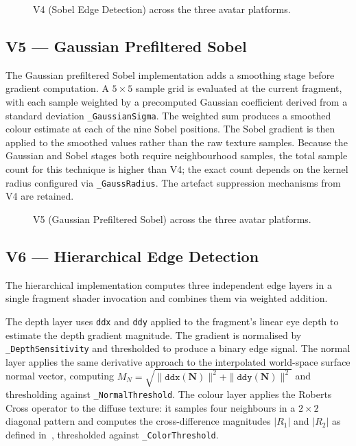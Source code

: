 \begin{figure}[H]
  \centering
  \caption{V4 (Sobel Edge Detection) across the three avatar platforms.}
  \label{fig:v4_impl}
\end{figure}

\subsection{V5 — Gaussian Prefiltered Sobel}
\label{sec:impl_v5}

The Gaussian prefiltered Sobel implementation adds a smoothing stage before gradient computation. A $5\times5$ sample grid is evaluated at the current fragment, with each sample weighted by a precomputed Gaussian coefficient derived from a standard deviation \texttt{\_GaussianSigma}. The weighted sum produces a smoothed colour estimate at each of the nine Sobel positions. The Sobel gradient is then applied to the smoothed values rather than the raw texture samples. Because the Gaussian and Sobel stages both require neighbourhood samples, the total sample count for this technique is higher than V4; the exact count depends on the kernel radius configured via \texttt{\_GaussRadius}. The artefact suppression mechanisms from V4 are retained.

\begin{figure}[H]
  \centering
  \caption{V5 (Gaussian Prefiltered Sobel) across the three avatar platforms.}
  \label{fig:v5_impl}
\end{figure}

\subsection{V6 — Hierarchical Edge Detection}
\label{sec:impl_v6}

The hierarchical implementation computes three independent edge layers in a single fragment shader invocation and combines them via weighted addition.

The depth layer uses \texttt{ddx} and \texttt{ddy} applied to the fragment's linear eye depth to estimate the depth gradient magnitude. The gradient is normalised by \texttt{\_DepthSensitivity} and thresholded to produce a binary edge signal. The normal layer applies the same derivative approach to the interpolated world-space surface normal vector, computing $M_N = \sqrt{\|\texttt{ddx}(\mathbf{N})\|^2 + \|\texttt{ddy}(\mathbf{N})\|^2}$ and thresholding against \texttt{\_NormalThreshold}. The colour layer applies the Roberts Cross operator to the diffuse texture: it samples four neighbours in a $2\times2$ diagonal pattern and computes the cross-difference magnitudes $|R_1|$ and $|R_2|$ as defined in~, thresholded against \texttt{\_ColorThreshold}.

